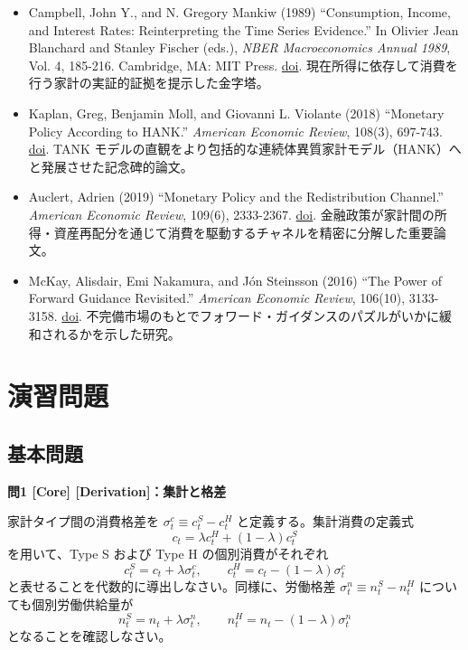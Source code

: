 \documentclass[
  japanese,
  lualatex,
  ja=standard,
  12pt,
  a4paper]{ltjsarticle}
\providecommand{\tightlist}{%
  \setlength{\itemsep}{0pt}\setlength{\parskip}{0pt}}
\begin{document}
\begin{itemize}
\tightlist
\item
  Campbell, John Y., and N. Gregory Mankiw (1989) ``Consumption, Income,
  and Interest Rates: Reinterpreting the Time Series Evidence.'' In
  Olivier Jean Blanchard and Stanley Fischer (eds.), \emph{NBER
  Macroeconomics Annual 1989}, Vol. 4, 185-216. Cambridge, MA: MIT
  Press. \href{https://doi.org/10.1086/654107}{doi}.
  現在所得に依存して消費を行う家計の実証的証拠を提示した金字塔。
\item
  Kaplan, Greg, Benjamin Moll, and Giovanni L. Violante (2018)
  ``Monetary Policy According to HANK.'' \emph{American Economic
  Review}, 108(3), 697-743.
  \href{https://doi.org/10.1257/aer.20160042}{doi}. TANK
  モデルの直観をより包括的な連続体異質家計モデル（HANK）へと発展させた記念碑的論文。
\item
  Auclert, Adrien (2019) ``Monetary Policy and the Redistribution
  Channel.'' \emph{American Economic Review}, 109(6), 2333-2367.
  \href{https://doi.org/10.1257/aer.20160137}{doi}.
  金融政策が家計間の所得・資産再配分を通じて消費を駆動するチャネルを精密に分解した重要論文。
\item
  McKay, Alisdair, Emi Nakamura, and Jón Steinsson (2016) ``The Power of
  Forward Guidance Revisited.'' \emph{American Economic Review},
  106(10), 3133-3158. \href{https://doi.org/10.1257/aer.20150063}{doi}.
  不完備市場のもとでフォワード・ガイダンスのパズルがいかに緩和されるかを示した研究。
\end{itemize}

\section{演習問題}\label{ux6f14ux7fd2ux554fux984c}


\subsection{基本問題}\label{ux57faux672cux554fux984c}


\textbf{問1 {[}Core{]} {[}Derivation{]}：集計と格差}

家計タイプ間の消費格差を \(\sigma_t^c \equiv c_t^S - c_t^H\)
と定義する。集計消費の定義式 \[
c_t = \lambda c_t^H + (1-\lambda) c_t^S
\] を用いて、Type S および Type H の個別消費がそれぞれ \[
c_t^S = c_t + \lambda \sigma_t^c,
\qquad
c_t^H = c_t - (1-\lambda) \sigma_t^c
\] と表せることを代数的に導出しなさい。同様に、労働格差
\(\sigma_t^n \equiv n_t^S - n_t^H\) についても個別労働供給量が \[
n_t^S = n_t + \lambda \sigma_t^n,
\qquad
n_t^H = n_t - (1-\lambda) \sigma_t^n
\] となることを確認しなさい。
\end{document}
